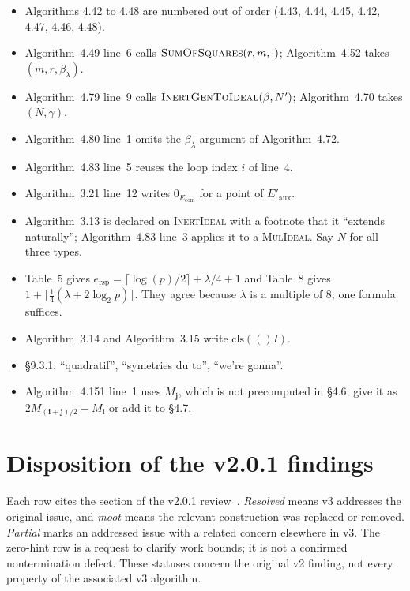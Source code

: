 \documentclass[a4paper,11pt]{article}
\newcommand{\algo}[1]{Algorithm~#1}
\begin{document}
\begin{itemize}[nosep]
  \item Algorithms 4.42 to 4.48 are numbered out of order (4.43, 4.44,
    4.45, 4.42, 4.47, 4.46, 4.48).
  \item \algo{4.49} line~6 calls $\textsc{SumOfSquares}(r, m, \cdot)$;
    \algo{4.52} takes $(m, r, \beta_\lambda)$.
  \item \algo{4.79} line~9 calls $\textsc{InertGenToIdeal}(\beta, N')$;
    \algo{4.70} takes $(N, \gamma)$.
  \item \algo{4.80} line~1 omits the $\beta_\lambda$ argument of
    \algo{4.72}.
  \item \algo{4.83} line~5 reuses the loop index $i$ of line~4.
  \item \algo{3.21} line~12 writes $0_{E_{\mathrm{com}}}$ for a point
    of $E'_{\mathrm{aux}}$.
  \item \algo{3.13} is declared on \textsc{InertIdeal} with a footnote
    that it ``extends naturally''; \algo{4.83} line~3 applies it to a
    \textsc{MulIdeal}.  Say $N$ for all three types.
  \item Table~5 gives $e_{\mathrm{rsp}} = \lceil \log(p)/2 \rceil +
    \lambda/4 + 1$ and Table~8 gives
    $1 + \lceil \tfrac14(\lambda + 2\log_2 p) \rceil$.  They agree
    because $\lambda$ is a multiple of 8; one formula suffices.
  \item \algo{3.14} and \algo{3.15} write $\mathrm{cls}(()I)$.
  \item \S9.3.1: ``quadratif'', ``symetries du to'', ``we're gonna''.
  \item \algo{4.151} line~1 uses $M_{\mathbf{j}}$, which is not
    precomputed in \S4.6; give it as
    $2M_{(\mathbf{i}+\mathbf{j})/2} - M_{\mathbf{i}}$ or add it to
    \S4.7.
\end{itemize}

\part{Disposition of the v2.0.1 findings}
\label{sec:v2}

Each row cites the section of the v2.0.1 review~\cite{v2-review}.
\emph{Resolved} means v3 addresses the original issue, and \emph{moot}
means the relevant construction was replaced or removed.
\emph{Partial} marks an addressed issue with a related concern elsewhere
in v3. The zero-hint row is a request to clarify work bounds; it is not a
confirmed nontermination defect. These statuses concern the original
v2 finding, not every property of the associated v3 algorithm.
\end{document}

